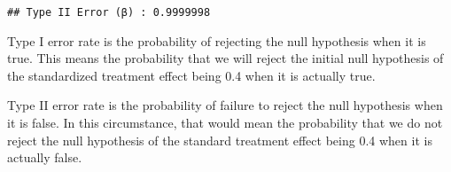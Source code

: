 \documentclass[
]{article}
\begin{document}
\begin{verbatim}
## Type II Error (β) : 0.9999998
\end{verbatim}

Type I error rate is the probability of rejecting the null hypothesis
when it is true. This means the probability that we will reject the
initial null hypothesis of the standardized treatment effect being 0.4
when it is actually true.

Type II error rate is the probability of failure to reject the null
hypothesis when it is false. In this circumstance, that would mean the
probability that we do not reject the null hypothesis of the standard
treatment effect being 0.4 when it is actually false.
\end{document}
